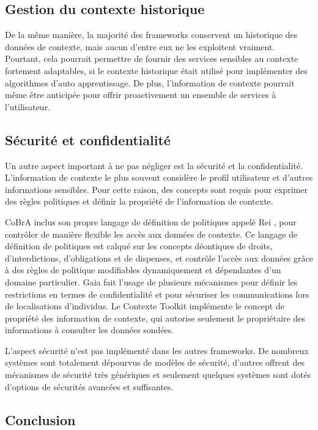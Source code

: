 \subsection{Gestion du contexte historique}

De la même manière, la majorité des frameworks conservent un historique des
données de contexte, mais aucun d'entre eux ne les exploitent vraiment.
Pourtant, cela pourrait permettre de fournir des services sensibles au contexte
fortement adaptables, si le contexte historique était utilisé pour implémenter
des algorithmes d'auto apprentissage. De plus, l'information de contexte
pourrait même être anticipée pour offrir proactivement un ensemble de services à
l'utilisateur.

\subsection{Sécurité et confidentialité}

Un autre aspect important à ne pas négliger est la sécurité et la
confidentialité. L'information de contexte le plus souvent considère le profil
utilisateur et d'autres informations sensibles. Pour cette raison, des concepts
sont requis pour exprimer des règles politiques et définir la propriété de
l'information de contexte. 

CoBrA inclus son propre langage de définition de politiques appelé Rei
\cite{kagal_policy_2005}, pour contrôler de manière flexible les accès aux
données de contexte. Ce langage de définition de politiques est calqué sur les
concepts déontiques de droits, d'interdictions, d'obligations et de dispenses,
et contrôle l'accès aux données grâce à des règles de politique modifiables
dynamiquement et dépendantes d'un domaine particulier. Gaia fait l'usage de
plusieurs mécanismes pour définir les restrictions en termes de confidentialité
et pour sécuriser les communications lors de localisations d'individus. Le
Contexte Toolkit implémente le concept de propriété des information de contexte,
qui autorise seulement le propriétaire des informations à consulter les données
sondées.

L'aspect sécurité n'est pas implémenté dans les autres frameworks. De nombreux
systèmes sont totalement dépourvus de modèles de sécurité, d'autres offrent des
mécanismes de sécurité très génériques et seulement quelques systèmes sont dotés
d'options de sécurités avancées et suffisantes.

\subsection{Conclusion}

